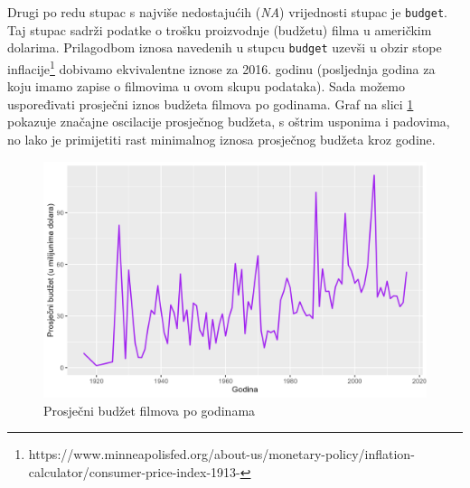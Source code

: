 	Drugi po redu stupac s najviše nedostajućih (\textit{NA}) vrijednosti stupac je \texttt{budget}. Taj stupac sadrži podatke o trošku proizvodnje (budžetu) filma u američkim dolarima. Prilagodbom iznosa navedenih u stupcu \texttt{budget} uzevši u obzir stope inflacije\footnote{https://www.minneapolisfed.org/about-us/monetary-policy/inflation-calculator/consumer-price-index-1913-} dobivamo ekvivalentne iznose za 2016. godinu (posljednja godina za koju imamo zapise o filmovima u ovom skupu podataka). Sada možemo uspoređivati prosječni iznos budžeta filmova po godinama. Graf na slici \ref{budzet} pokazuje značajne oscilacije prosječnog budžeta, s oštrim usponima i padovima, no lako je primijetiti rast minimalnog iznosa prosječnog budžeta kroz godine.
	  
	\begin{figure}[H]
		\centering
		\includegraphics[width=15cm]{../figures/analysis/prosjecni_budzet.png}
		\caption{Prosječni budžet filmova po godinama}
		\label{budzet}
	\end{figure}
	
	
	
	
	
	
	
	
	
	
	